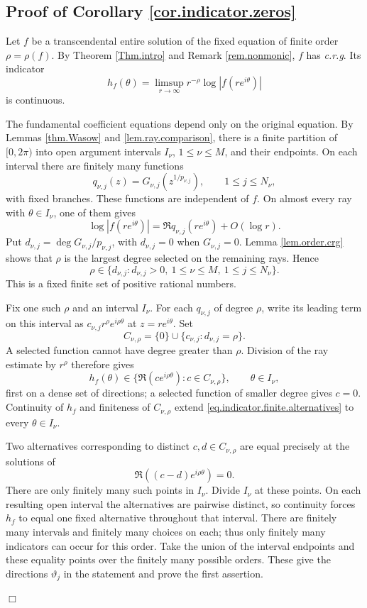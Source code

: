 \documentclass[a4paper,12pt]{article}
\newenvironment{proof}
{\noindent{\it Proof.}}{\hfill $\Box$\par\vspace{2.5mm}}
\numberwithin{equation}{section}
\begin{document}
\subsection{Proof of Corollary \ref{cor.indicator.zeros}}
\begin{proof}
Let $f$ be a transcendental entire solution of the fixed equation
of finite order $\rho=\rho(f)$.
By Theorem \ref{Thm.intro} and Remark \ref{rem.nonmonic},
$f$ has \textit{c.r.g}. Its indicator
\[
 h_f(\theta)=\limsup_{r\to\infty}r^{-\rho}\log|f(re^{i\theta})|
\]
is continuous.

The fundamental coefficient equations depend only on the original
equation. By Lemmas \ref{thm.Wasow} and \ref{lem.ray.comparison},
there is a finite partition of $[0,2\pi)$ into open argument intervals
$I_\nu$, $1\le\nu\le M$, and their endpoints.
On each interval there are finitely many functions
\[
 q_{\nu,j}(z)=G_{\nu,j}(z^{1/p_{\nu,j}}),
 \qquad 1\le j\le N_\nu,
\]
with fixed branches. These functions are independent of $f$.
On almost every ray with $\theta\in I_\nu$, one of them gives
\[
 \log|f(re^{i\theta})|
 =\Re q_{\nu,j}(re^{i\theta})+O(\log r).
\]
Put $d_{\nu,j}=\deg G_{\nu,j}/p_{\nu,j}$, with $d_{\nu,j}=0$
when $G_{\nu,j}=0$.
Lemma \ref{lem.order.crg} shows that $\rho$ is the largest degree
selected on the remaining rays. Hence
\[
 \rho\in\{d_{\nu,j}:d_{\nu,j}>0,\ 1\le\nu\le M,
                                      \ 1\le j\le N_\nu\}.
\]
This is a fixed finite set of positive rational numbers.

Fix one such $\rho$ and an interval $I_\nu$.
For each $q_{\nu,j}$ of degree $\rho$, write its leading term on this
interval as $c_{\nu,j}r^\rho e^{i\rho\theta}$ at $z=re^{i\theta}$.
Set
\[
 C_{\nu,\rho}=\{0\}\cup
               \{c_{\nu,j}:d_{\nu,j}=\rho\}.
\]
A selected function cannot have degree greater than $\rho$.
Division of the ray estimate by $r^\rho$ therefore gives
\begin{equation}\label{eq.indicator.finite.alternatives}
 h_f(\theta)\in
 \{\Re(c e^{i\rho\theta}):c\in C_{\nu,\rho}\},
 \qquad \theta\in I_\nu,
\end{equation}
first on a dense set of directions; a selected function of smaller
degree gives $c=0$.
Continuity of $h_f$ and finiteness of $C_{\nu,\rho}$ extend
\eqref{eq.indicator.finite.alternatives} to every $\theta\in I_\nu$.

Two alternatives corresponding to distinct $c,d\in C_{\nu,\rho}$
are equal precisely at the solutions of
\[
 \Re((c-d)e^{i\rho\theta})=0.
\]
There are only finitely many such points in $I_\nu$.
Divide $I_\nu$ at these points. On each resulting open interval the
alternatives are pairwise distinct, so continuity forces $h_f$ to
equal one fixed alternative throughout that interval.
There are finitely many intervals and finitely many choices on each;
thus only finitely many indicators can occur for this order.
Take the union of the interval endpoints and these equality points
over the finitely many possible orders. These give the directions
$\vartheta_j$ in the statement and prove the first assertion.


\end{proof}
\end{document}
